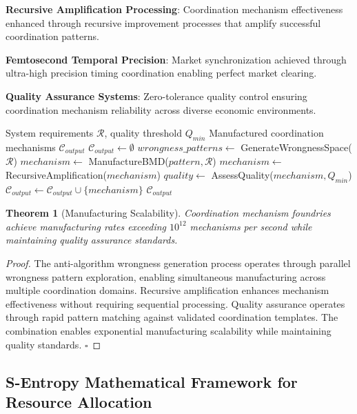 \documentclass[12pt,a4paper]{article}
\newtheorem{theorem}{Theorem}
\begin{document}
\textbf{Recursive Amplification Processing}: Coordination mechanism effectiveness enhanced through recursive improvement processes that amplify successful coordination patterns.

\textbf{Femtosecond Temporal Precision}: Market synchronization achieved through ultra-high precision timing coordination enabling perfect market clearing.

\textbf{Quality Assurance Systems}: Zero-tolerance quality control ensuring coordination mechanism reliability across diverse economic environments.

\begin{algorithm}
\caption{Industrial BMD Coordination Manufacturing}
\begin{algorithmic}[1]
\Require System requirements $\mathcal{R}$, quality threshold $Q_{min}$
\Ensure Manufactured coordination mechanisms $\mathcal{C}_{output}$
\State $\mathcal{C}_{output} \leftarrow \emptyset$
\State $wrongness\_patterns \leftarrow$ GenerateWrongnessSpace($\mathcal{R}$)
    \State $mechanism \leftarrow$ ManufactureBMD($pattern, \mathcal{R}$)
    \State $mechanism \leftarrow$ RecursiveAmplification($mechanism$)
    \State $quality \leftarrow$ AssessQuality($mechanism, Q_{min}$)
        \State $\mathcal{C}_{output} \leftarrow \mathcal{C}_{output} \cup \{mechanism\}$
    \EndIf
\EndFor
\Return $\mathcal{C}_{output}$
\end{algorithmic}
\end{algorithm}

\begin{theorem}[Manufacturing Scalability]
Coordination mechanism foundries achieve manufacturing rates exceeding $10^{12}$ mechanisms per second while maintaining quality assurance standards.
\end{theorem}

\begin{proof}
The anti-algorithm wrongness generation process operates through parallel wrongness pattern exploration, enabling simultaneous manufacturing across multiple coordination domains. Recursive amplification enhances mechanism effectiveness without requiring sequential processing. Quality assurance operates through rapid pattern matching against validated coordination templates. The combination enables exponential manufacturing scalability while maintaining quality standards. $\square$
\end{proof}

\subsection{S-Entropy Mathematical Framework for Resource Allocation}
\end{document}
